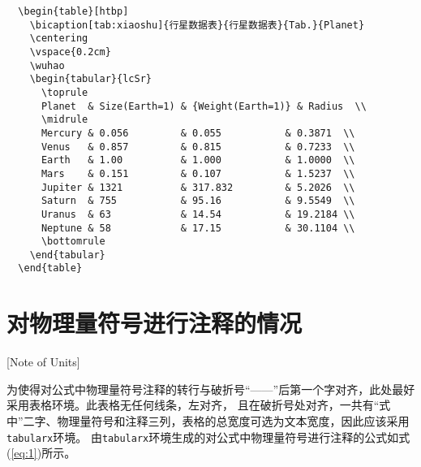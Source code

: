 \begin{lstlisting}
  \begin{table}[htbp]
    \bicaption[tab:xiaoshu]{行星数据表}{行星数据表}{Tab.}{Planet}
    \centering
    \vspace{0.2cm}
    \wuhao
    \begin{tabular}{lcSr}
      \toprule
      Planet  & Size(Earth=1) & {Weight(Earth=1)} & Radius  \\
      \midrule
      Mercury & 0.056         & 0.055           & 0.3871  \\
      Venus   & 0.857         & 0.815           & 0.7233  \\
      Earth   & 1.00          & 1.000           & 1.0000  \\
      Mars    & 0.151         & 0.107           & 1.5237  \\
      Jupiter & 1321          & 317.832         & 5.2026  \\
      Saturn  & 755           & 95.16           & 9.5549  \\
      Uranus  & 63            & 14.54           & 19.2184 \\
      Neptune & 58            & 17.15           & 30.1104 \\
      \bottomrule
    \end{tabular}
  \end{table}
\end{lstlisting}

\section{对物理量符号进行注释的情况}[Note of Units]

为使得对公式中物理量符号注释的转行与破折号“——”后第一个字对齐，此处最好采用表格环境。此表格无任何线条，左对齐，
且在破折号处对齐，一共有“式中”二字、物理量符号和注释三列，表格的总宽度可选为文本宽度，因此应该采用\verb|tabularx|环境。
由\verb|tabularx|环境生成的对公式中物理量符号进行注释的公式如式(\ref{eq:1})所示。

